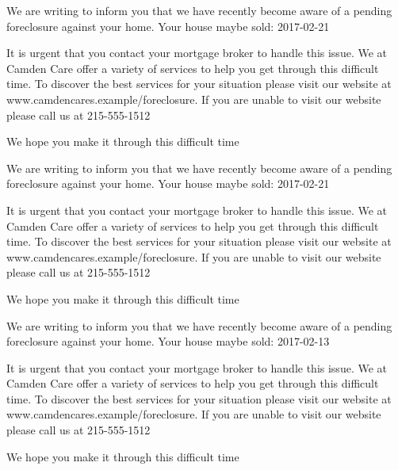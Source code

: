 \documentclass[10pt,stdletter]{newlfm}
\begin{document}
\pagebreak
{}
\begin{newlfm}

We are writing to inform you that we have recently become aware of a pending foreclosure against your home. Your house maybe sold: 2017-02-21

It is urgent that you contact your mortgage broker to handle this issue.
We at Camden Care offer a variety of services to help you get through this difficult time. To discover the best services for your situation please visit our website at www.camdencares.example/foreclosure.
If you are unable to visit our website please call us at 215-555-1512

We hope you make it through this difficult time

\end{newlfm}
\pagebreak
{}
\begin{newlfm}

We are writing to inform you that we have recently become aware of a pending foreclosure against your home. Your house maybe sold: 2017-02-21

It is urgent that you contact your mortgage broker to handle this issue.
We at Camden Care offer a variety of services to help you get through this difficult time. To discover the best services for your situation please visit our website at www.camdencares.example/foreclosure.
If you are unable to visit our website please call us at 215-555-1512

We hope you make it through this difficult time

\end{newlfm}
\pagebreak
{}
\begin{newlfm}

We are writing to inform you that we have recently become aware of a pending foreclosure against your home. Your house maybe sold: 2017-02-13

It is urgent that you contact your mortgage broker to handle this issue.
We at Camden Care offer a variety of services to help you get through this difficult time. To discover the best services for your situation please visit our website at www.camdencares.example/foreclosure.
If you are unable to visit our website please call us at 215-555-1512

We hope you make it through this difficult time

\end{newlfm}
\end{document}
